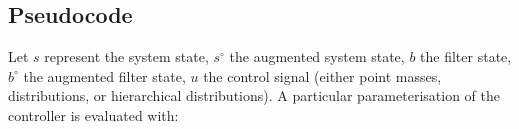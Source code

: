 \documentclass[9pt]{article}
\newcommand{\trg}[1]{#1^\circ}              %
\begin{document}
\subsection{Pseudocode}

Let $s$ represent the system state, $\trg{s}$ the augmented system state, $b$ the filter state, $\trg{b}$ the augmented filter state, $u$ the control signal (either point masses, distributions, or hierarchical distributions). A particular parameterisation of the controller is evaluated with:

\vspace{0.5cm}

\end{document}
